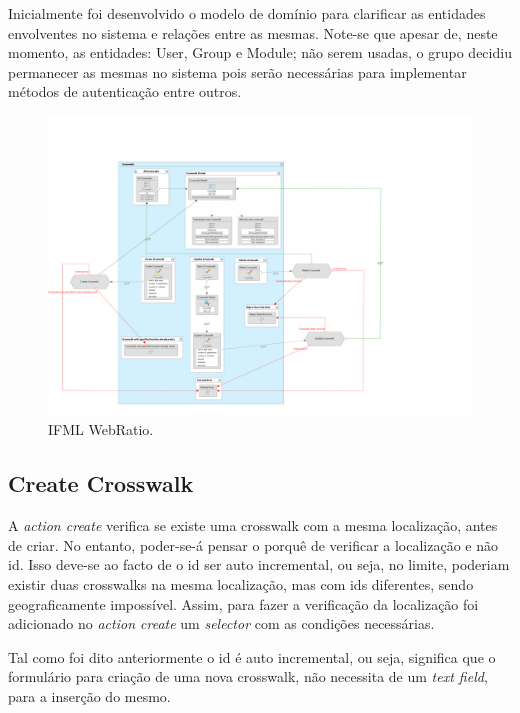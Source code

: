 \documentclass[11pt,a4paper]{report}%
\begin{document}
\hspace{5mm} Inicialmente foi desenvolvido o modelo de domínio para clarificar as entidades envolventes no sistema e relações entre as mesmas. Note-se que apesar de, neste momento, as entidades: User, Group e Module; não serem usadas, o grupo decidiu permanecer as mesmas no sistema pois serão necessárias para implementar métodos de autenticação entre outros.

\begin{figure}[H]
    \centering
    \includegraphics[scale=0.55]{arquitetura.png}
    \caption{IFML WebRatio.}
    \label{fig:arquitetura}
\end{figure}

\subsection{Create Crosswalk}
\hspace{5mm} A \textit{action create} verifica se existe uma crosswalk com a mesma localização, antes de criar. No entanto, poder-se-á pensar o porquê de verificar a localização e não id. Isso deve-se ao facto de o id ser auto incremental, ou seja, no limite, poderiam existir duas crosswalks na mesma localização, mas com ids diferentes, sendo geograficamente impossível. Assim, para fazer a verificação da localização foi adicionado no \textit{action create} um \textit{selector} com as condições necessárias. 

\hspace{5mm} Tal como foi dito anteriormente o id é auto incremental, ou seja, significa que o formulário para criação de uma nova crosswalk, não necessita de um \textit{text field}, para a inserção do mesmo.
\end{document}
